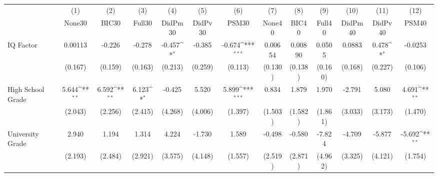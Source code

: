 {
\def\sym#1{\ifmmode^{#1}\else\(^{#1}\)\fi}
\begin{tabular}{l*{12}{c}}
\toprule
            &\multicolumn{1}{c}{(1)}&\multicolumn{1}{c}{(2)}&\multicolumn{1}{c}{(3)}&\multicolumn{1}{c}{(4)}&\multicolumn{1}{c}{(5)}&\multicolumn{1}{c}{(6)}&\multicolumn{1}{c}{(7)}&\multicolumn{1}{c}{(8)}&\multicolumn{1}{c}{(9)}&\multicolumn{1}{c}{(10)}&\multicolumn{1}{c}{(11)}&\multicolumn{1}{c}{(12)}\\
            &\multicolumn{1}{c}{None30}&\multicolumn{1}{c}{BIC30}&\multicolumn{1}{c}{Full30}&\multicolumn{1}{c}{DidPm30}&\multicolumn{1}{c}{DidPv30}&\multicolumn{1}{c}{PSM30}&\multicolumn{1}{c}{None40}&\multicolumn{1}{c}{BIC40}&\multicolumn{1}{c}{Full40}&\multicolumn{1}{c}{DidPm40}&\multicolumn{1}{c}{DidPv40}&\multicolumn{1}{c}{PSM40}\\
\midrule
IQ Factor   &     0.00113         &      -0.226         &      -0.278         &      -0.457\sym{*}  &      -0.385         &      -0.674\sym{***}&     0.00654         &     0.00890         &      0.0505         &      0.0883         &       0.478\sym{*}  &     -0.0253         \\
            &     (0.167)         &     (0.159)         &     (0.163)         &     (0.213)         &     (0.259)         &     (0.113)         &     (0.130)         &     (0.138)         &     (0.160)         &     (0.168)         &     (0.227)         &     (0.106)         \\
\addlinespace
High School Grade&       5.644\sym{**} &       6.592\sym{**} &       6.123\sym{*}  &      -0.425         &       5.520         &       5.899\sym{***}&       0.834         &       1.879         &       1.970         &      -2.791         &       5.080         &       4.691\sym{**} \\
            &     (2.043)         &     (2.256)         &     (2.415)         &     (4.268)         &     (4.006)         &     (1.397)         &     (1.503)         &     (1.582)         &     (1.861)         &     (3.033)         &     (3.173)         &     (1.470)         \\
\addlinespace
University Grade&       2.940         &       1.194         &       1.314         &       4.224         &      -1.730         &       1.589         &      -0.498         &      -0.580         &      -7.824         &      -4.709         &      -5.877         &      -5.692\sym{**} \\
            &     (2.193)         &     (2.484)         &     (2.921)         &     (3.575)         &     (4.148)         &     (1.557)         &     (2.519)         &     (2.871)         &     (4.962)         &     (3.325)         &     (4.121)         &     (1.754)         \\

\end{tabular}}
